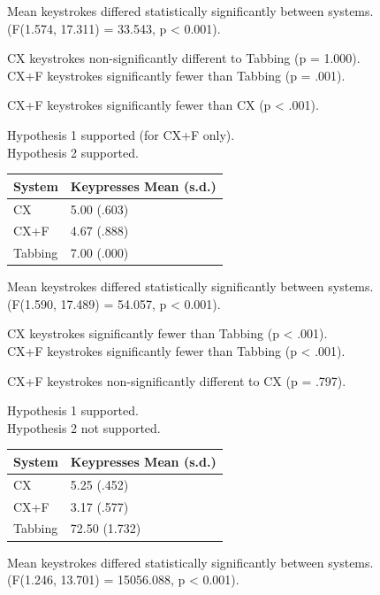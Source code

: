 \documentclass[11pt,openright,a4paper]{report}
\begin{document}
Mean keystrokes differed statistically significantly between systems.\\
(F(1.574, 17.311) = 33.543, p < 0.001).

CX keystrokes non-significantly different to Tabbing (p = 1.000).\\
CX+F keystrokes significantly fewer than Tabbing (p = .001).

CX+F keystrokes significantly fewer than CX (p < .001).

Hypothesis 1 supported (for CX+F only).\\
Hypothesis 2 supported.

\begin{tabular}{l l}
\hline\hline %
System & Keypresses Mean (s.d.) \\ [0.5ex] %
\hline %
CX & 5.00 (.603)\\
CX+F & 4.67 (.888)\\
Tabbing & 7.00 (.000)\\ [1ex] %
\hline %
\end{tabular}

Mean keystrokes differed statistically significantly between systems.\\
(F(1.590, 17.489) = 54.057, p < 0.001).

CX keystrokes significantly fewer than Tabbing (p < .001).\\
CX+F keystrokes significantly fewer than Tabbing (p < .001).

CX+F keystrokes non-significantly different to CX (p = .797).

Hypothesis 1 supported.\\
Hypothesis 2 not supported.

\begin{tabular}{l l}
\hline\hline %
System & Keypresses Mean (s.d.) \\ [0.5ex] %
\hline %
CX & 5.25 (.452)\\
CX+F & 3.17 (.577)\\
Tabbing & 72.50 (1.732)\\ [1ex] %
\hline %
\end{tabular}

Mean keystrokes differed statistically significantly between systems.\\
(F(1.246, 13.701) = 15056.088, p < 0.001).
\end{document}
